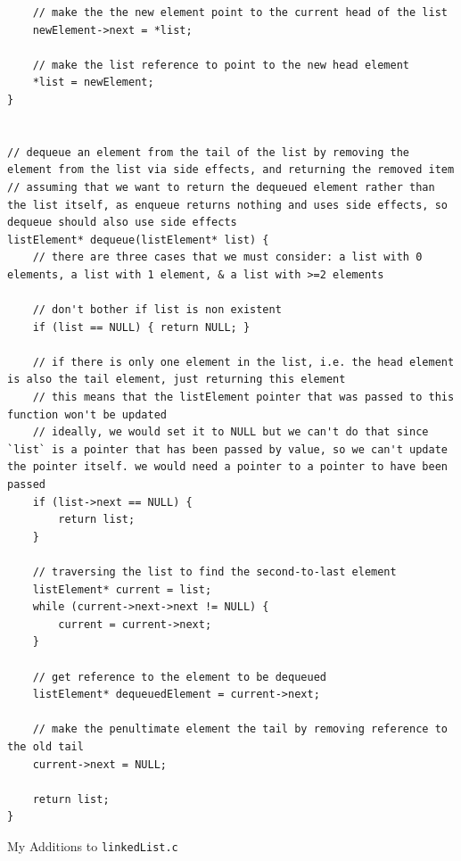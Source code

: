 \documentclass[a4paper]{article}
\newenvironment{code}{\captionsetup{type=listing, skip=0pt}}{}
\begin{document}
\begin{code}
\begin{verbatim}
    // make the the new element point to the current head of the list
    newElement->next = *list;

    // make the list reference to point to the new head element 
    *list = newElement;
} 


// dequeue an element from the tail of the list by removing the element from the list via side effects, and returning the removed item
// assuming that we want to return the dequeued element rather than the list itself, as enqueue returns nothing and uses side effects, so dequeue should also use side effects
listElement* dequeue(listElement* list) {
    // there are three cases that we must consider: a list with 0 elements, a list with 1 element, & a list with >=2 elements

    // don't bother if list is non existent
    if (list == NULL) { return NULL; }

    // if there is only one element in the list, i.e. the head element is also the tail element, just returning this element
    // this means that the listElement pointer that was passed to this function won't be updated
    // ideally, we would set it to NULL but we can't do that since `list` is a pointer that has been passed by value, so we can't update the pointer itself. we would need a pointer to a pointer to have been passed 
    if (list->next == NULL) {
        return list;
    }

    // traversing the list to find the second-to-last element
    listElement* current = list;
    while (current->next->next != NULL) {
        current = current->next;
    }

    // get reference to the element to be dequeued
    listElement* dequeuedElement = current->next;

    // make the penultimate element the tail by removing reference to the old tail
    current->next = NULL;

    return list;
}
\end{verbatim}
\caption{My Additions to \texttt{linkedList.c}}
\end{code}
\end{document}
